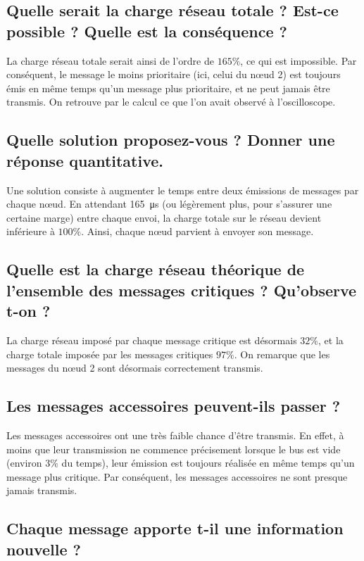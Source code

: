 \documentclass[12pt]{article}
\begin{document}
\subsection{Quelle serait la charge réseau totale ? Est-ce possible ? Quelle est la conséquence ?}

La charge réseau totale serait ainsi de l'ordre de $165\%$, ce qui est impossible. Par conséquent, le message le moins prioritaire (ici, celui du nœud 2) est toujours émis en même temps qu'un message plus prioritaire, et ne peut jamais être transmis. On retrouve par le calcul ce que l'on avait observé à l'oscilloscope.

\subsection{Quelle solution proposez-vous ? Donner une réponse quantitative.} 

Une solution consiste à augmenter le temps entre deux émissions de messages par chaque nœud. En attendant \SI{165}{\micro\second} (ou légèrement plus, pour s'assurer une certaine marge) entre chaque envoi, la charge totale sur le réseau devient inférieure à $100\%$. Ainsi, chaque nœud parvient à envoyer son message.

\subsection{Quelle est la charge réseau théorique de l'ensemble des messages critiques ? Qu'observe t-on ?}

La charge réseau imposé par chaque message critique est désormais $32\%$, et la charge totale imposée par les messages critiques $97\%$. On remarque que les messages du nœud 2 sont désormais correctement transmis.

\subsection{Les messages accessoires peuvent-ils passer ?}

Les messages accessoires ont une très faible chance d'être transmis. En effet, à moins que leur transmission ne commence précisement lorsque le bus est vide (environ $3\%$ du temps), leur émission est toujours réalisée en même temps qu'un message plus critique. Par conséquent, les messages accessoires ne sont presque jamais transmis.

\subsection{Chaque message apporte t-il une information nouvelle ?}
\end{document}
